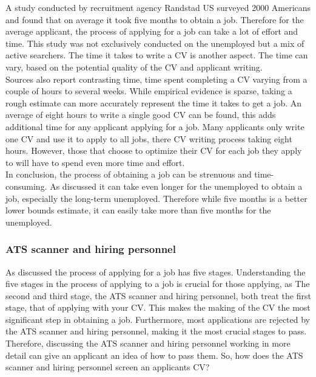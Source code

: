 A study conducted by recruitment agency Randstad US surveyed 2000 Americans and found that on average it took five months to obtain a job.\cite{5_month_for_a_job}
Therefore for the average applicant, the process of applying for a job can take a lot of effort and time.
This study was not exclusively conducted on the unemployed but a mix of active searchers.
The time it takes to write a CV is another aspect.
The time can vary, based on the potential quality of the CV and applicant writing. \\
 
Sources also report contrasting time, time spent completing a CV varying from a couple of hours to several weeks.
While empirical evidence is sparse, taking a rough estimate can more accurately represent the time it takes to get a job.
An average of eight hours to write a single good CV can be found, this adds additional time for any applicant applying for a job.
Many applicants only write one CV and use it to apply to all jobs, there CV writing process taking eight hours.\cite{CV_Using_One}
However, those that choose to optimize their CV for each job they apply to will have to spend even more time and effort. \\

In conclusion, the process of obtaining a job can be strenuous and time-consuming.\cite{Time_spent_writing_CV}
As discussed it can take even longer for the unemployed to obtain a job, especially the long-term unemployed.
Therefore while five months is a better lower bounds estimate, it can easily take more than five months for the unemployed. \\

\subsubsection{ATS scanner and hiring personnel}
As discussed the process of applying for a job has five stages.
Understanding the five stages in the process of applying to a job is crucial for those applying, as 
The second and third stage, the ATS scanner and hiring personnel, both treat the first stage, that of applying with your CV.
This makes the making of the CV the most significant step in obtaining a job.
Furthermore, most applications are rejected by the ATS scanner and hiring personnel, making it the most crucial stages to pass.
Therefore, discussing the ATS scanner and hiring personnel working in more detail can give an applicant an idea of how to pass them.
So, how does the ATS scanner and hiring personnel screen an applicants CV? \\

